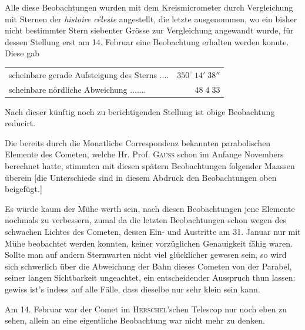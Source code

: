 \par\indent Alle diese Beobachtungen wurden mit dem Kreismicrometer durch Vergleichung mit Sternen der
\emph{histoire céleste} angestellt, die letzte ausgenommen, wo ein bisher nicht bestimmter Stern
siebenter Grösse zur Vergleichung angewandt wurde, für dessen Stellung erst am 14. Februar eine
Beobachtung erhalten werden konnte. Diese gab


\begin{center}\fontsize{10}{12}\selectfont\setlength{\tabcolsep}{2pt}\renewcommand{\arraystretch}{1.15}\begin{tabular}{lr}
scheinbare gerade Aufsteigung des Sterns .\;.\;.\;.\; & $350^\circ\;14'\;38''$\\
scheinbare nördliche Abweichung .\;.\;.\;.\;.\;.\;.\; & $48\;4\;33$\\
\end{tabular}\end{center}

\noindent Nach dieser künftig noch zu berichtigenden Stellung ist obige Beobachtung reducirt.

\par\indent Die bereits durch die Monatliche Correspondenz bekannten parabolischen Elemente des Cometen,
welche Hr. Prof. \textsc{Gauss} schon im Anfange Novembers berechnet hatte, stimmten mit diesen
spätern Beobachtungen folgender Maassen überein [die Unterschiede sind in diesem Abdruck den
Beobachtungen oben beigefügt.]

\par\indent Es würde kaum der Mühe werth sein, nach diesen Beobachtungen jene Elemente nochmals zu verbessern,
zumal da die letzten Beobachtungen schon wegen des schwachen Lichtes des Cometen, dessen Ein- und
Austritte am 31. Januar nur mit Mühe beobachtet werden konnten, keiner vorzüglichen Genauigkeit
fähig waren. Sollte man auf andern Sternwarten nicht viel glücklicher gewesen sein, so wird sich
schwerlich über die Abweichung der Bahn dieses Cometen von der Parabel, seiner langen Sichtbarkeit ungeachtet, ein entscheidender Ausspruch thun lassen: gewiss ist's indess auf alle Fälle,
dass dieselbe nur sehr klein sein kann.

\par\indent Am 14. Februar war der Comet im \textsc{Herschel}'schen Telescop nur noch eben zu sehen, allein an
eine eigentliche Beobachtung war nicht mehr zu denken.
